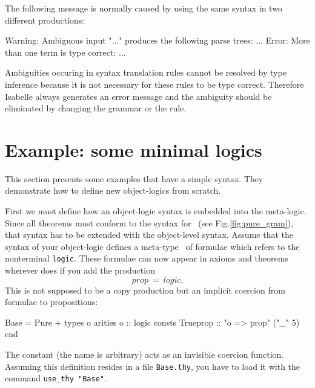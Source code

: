 The following message is normally caused by using the same
syntax in two different productions:

\begin{ttbox}
{\out Warning: Ambiguous input "..."}
{\out produces the following parse trees:}
{\out ...}
{\out Error: More than one term is type correct:}
{\out ...}
\end{ttbox}

Ambiguities occuring in syntax translation rules cannot be resolved by
type inference because it is not necessary for these rules to be type
correct. Therefore Isabelle always generates an error message and the
ambiguity should be eliminated by changing the grammar or the rule.


\section{Example: some minimal logics} \label{sec:min_logics}

This section presents some examples that have a simple syntax.  They
demonstrate how to define new object-logics from scratch.

First we must define how an object-logic syntax is embedded into the
meta-logic.  Since all theorems must conform to the syntax for~
(see Fig.\ts\ref{fig:pure_gram}), that syntax has to be extended with the
object-level syntax.  Assume that the syntax of your object-logic defines a
meta-type~ of formulae which refers to the nonterminal {\tt logic}.
These formulae can now appear in axioms and theorems wherever  does
if you add the production
\[ prop ~=~ logic. \]
This is not supposed to be a copy production but an implicit coercion from
formulae to propositions:
\begin{ttbox}
Base = Pure +
types
  o
arities
  o :: logic
consts
  Trueprop :: "o => prop"   ("_" 5)
end
\end{ttbox}
The constant  (the name is arbitrary) acts as an invisible
coercion function.  Assuming this definition resides in a file {\tt Base.thy},
you have to load it with the command {\tt use_thy "Base"}.

